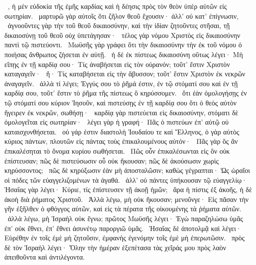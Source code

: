 ~, ἡ μὲν εὐδοκία τῆς ἐμῆς καρδίας καὶ ἡ δέησις πρὸς τὸν θεὸν ὑπὲρ αὐτῶν εἰς σωτηρίαν.
~μαρτυρῶ γὰρ αὐτοῖς ὅτι ζῆλον θεοῦ ἔχουσιν· ἀλλ’ οὐ κατ’ ἐπίγνωσιν,
~ἀγνοοῦντες γὰρ τὴν τοῦ θεοῦ δικαιοσύνην, καὶ τὴν ἰδίαν ζητοῦντες στῆσαι, τῇ δικαιοσύνῃ τοῦ θεοῦ οὐχ ὑπετάγησαν·
~τέλος γὰρ νόμου Χριστὸς εἰς δικαιοσύνην παντὶ τῷ πιστεύοντι.
~Μωϋσῆς γὰρ γράφει ὅτι τὴν δικαιοσύνην τὴν ἐκ τοῦ νόμου ὁ ποιήσας ἄνθρωπος ζήσεται ἐν αὐτῇ.
~ἡ δὲ ἐκ πίστεως δικαιοσύνη οὕτως λέγει· Μὴ εἴπῃς ἐν τῇ καρδίᾳ σου· Τίς ἀναβήσεται εἰς τὸν οὐρανόν; τοῦτ’ ἔστιν Χριστὸν καταγαγεῖν·
~ἤ· Τίς καταβήσεται εἰς τὴν ἄβυσσον; τοῦτ’ ἔστιν Χριστὸν ἐκ νεκρῶν ἀναγαγεῖν.
~ἀλλὰ τί λέγει; Ἐγγύς σου τὸ ῥῆμά ἐστιν, ἐν τῷ στόματί σου καὶ ἐν τῇ καρδίᾳ σου, τοῦτ’ ἔστιν τὸ ῥῆμα τῆς πίστεως ὃ κηρύσσομεν.
~ὅτι ἐὰν ὁμολογήσῃς ἐν τῷ στόματί σου κύριον Ἰησοῦν, καὶ πιστεύσῃς ἐν τῇ καρδίᾳ σου ὅτι ὁ θεὸς αὐτὸν ἤγειρεν ἐκ νεκρῶν, σωθήσῃ·
~καρδίᾳ γὰρ πιστεύεται εἰς δικαιοσύνην, στόματι δὲ ὁμολογεῖται εἰς σωτηρίαν·
~λέγει γὰρ ἡ γραφή· Πᾶς ὁ πιστεύων ἐπ’ αὐτῷ οὐ καταισχυνθήσεται.
~οὐ γάρ ἐστιν διαστολὴ Ἰουδαίου τε καὶ Ἕλληνος, ὁ γὰρ αὐτὸς κύριος πάντων, πλουτῶν εἰς πάντας τοὺς ἐπικαλουμένους αὐτόν·
~Πᾶς γὰρ ὃς ἂν ἐπικαλέσηται τὸ ὄνομα κυρίου σωθήσεται.
~Πῶς οὖν ἐπικαλέσωνται εἰς ὃν οὐκ ἐπίστευσαν; πῶς δὲ πιστεύσωσιν οὗ οὐκ ἤκουσαν; πῶς δὲ ἀκούσωσιν χωρὶς κηρύσσοντος;
~πῶς δὲ κηρύξωσιν ἐὰν μὴ ἀποσταλῶσιν; καθὼς γέγραπται· Ὡς ὡραῖοι οἱ πόδες τῶν εὐαγγελιζομένων τὰ ἀγαθά.
~ἀλλ’ οὐ πάντες ὑπήκουσαν τῷ εὐαγγελίῳ· Ἠσαΐας γὰρ λέγει· Κύριε, τίς ἐπίστευσεν τῇ ἀκοῇ ἡμῶν;
~ἄρα ἡ πίστις ἐξ ἀκοῆς, ἡ δὲ ἀκοὴ διὰ ῥήματος Χριστοῦ.
~Ἀλλὰ λέγω, μὴ οὐκ ἤκουσαν; μενοῦνγε· Εἰς πᾶσαν τὴν γῆν ἐξῆλθεν ὁ φθόγγος αὐτῶν, καὶ εἰς τὰ πέρατα τῆς οἰκουμένης τὰ ῥήματα αὐτῶν.
~ἀλλὰ λέγω, μὴ Ἰσραὴλ οὐκ ἔγνω; πρῶτος Μωϋσῆς λέγει· Ἐγὼ παραζηλώσω ὑμᾶς ἐπ’ οὐκ ἔθνει, ἐπ’ ἔθνει ἀσυνέτῳ παροργιῶ ὑμᾶς.
~Ἠσαΐας δὲ ἀποτολμᾷ καὶ λέγει· Εὑρέθην ἐν τοῖς ἐμὲ μὴ ζητοῦσιν, ἐμφανὴς ἐγενόμην τοῖς ἐμὲ μὴ ἐπερωτῶσιν.
~πρὸς δὲ τὸν Ἰσραὴλ λέγει· Ὅλην τὴν ἡμέραν ἐξεπέτασα τὰς χεῖράς μου πρὸς λαὸν ἀπειθοῦντα καὶ ἀντιλέγοντα.

